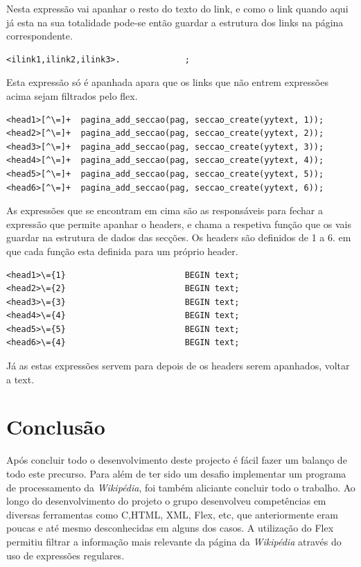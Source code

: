 \documentclass[11pt, a4paper, oneside]{article}
\begin{document}
Nesta expressão vai apanhar o resto do texto do link, e como o link quando aqui já esta na sua totalidade pode-se então guardar a estrutura dos links na página correspondente.


\begin{verbatim}
<ilink1,ilink2,ilink3>.             ;
\end{verbatim}
Esta expressão só é apanhada apara que os links que não entrem expressões acima sejam filtrados pelo flex. 



\begin{verbatim}
<head1>[^\=]+  pagina_add_seccao(pag, seccao_create(yytext, 1));
<head2>[^\=]+  pagina_add_seccao(pag, seccao_create(yytext, 2));
<head3>[^\=]+  pagina_add_seccao(pag, seccao_create(yytext, 3));
<head4>[^\=]+  pagina_add_seccao(pag, seccao_create(yytext, 4));
<head5>[^\=]+  pagina_add_seccao(pag, seccao_create(yytext, 5));
<head6>[^\=]+  pagina_add_seccao(pag, seccao_create(yytext, 6));
\end{verbatim}
As expressões que se encontram em cima são as responsáveis para fechar a expressão que permite apanhar o headers, e chama a respetiva função que os vais guardar na estrutura de dados das secções. Os headers são definidos de 1 a 6. em que cada função esta definida para um próprio header. 

\begin{verbatim}
<head1>\={1}                        BEGIN text;
<head2>\={2}                        BEGIN text;
<head3>\={3}                        BEGIN text;
<head4>\={4}                        BEGIN text;
<head5>\={5}                        BEGIN text;
<head6>\={4}                        BEGIN text;

\end{verbatim}
Já as estas expressões servem para depois de os headers serem apanhados, voltar a text.

\newpage
\section{Conclusão}

Após concluir todo o desenvolvimento deste projecto é fácil fazer um balanço de todo este precurso. Para além de ter sido um desafio implementar um programa de processamento da \textit{Wikipédia}, foi também aliciante concluir todo o trabalho.
Ao longo do desenvolvimento do projeto o grupo desenvolveu competências em diversas ferramentas como C,HTML, XML, Flex, etc, que anteriormente eram poucas e até mesmo desconhecidas em alguns dos casos. 
A utilização do Flex permitiu filtrar a informação mais relevante da página da \textit{Wikipédia} através do uso de expressões regulares. 
\newpage
\end{document}
